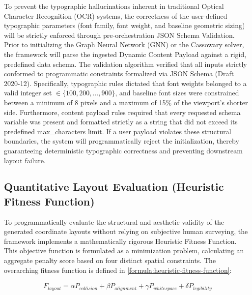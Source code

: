 \begin{refsection}
To prevent the typographic hallucinations inherent in traditional Optical Character Recognition (OCR) systems, the correctness of the user-defined typographic parameters (font family, font weight, and baseline geometric sizing) will be strictly enforced through pre-orchestration JSON Schema Validation. Prior to initializing the Graph Neural Network (GNN) or the Cassowary solver, the framework will parse the ingested Dynamic Content Payload against a rigid, predefined data schema. The validation algorithm verified that all inputs strictly conformed to programmatic constraints formalized via JSON Schema (Draft 2020-12). Specifically, typographic rules dictated that font weights belonged to a valid integer set $\in \{100, 200, \dots, 900\}$, and baseline font sizes were constrained between a minimum of 8 pixels and a maximum of 15\% of the viewport's shorter side. Furthermore, content payload rules required that every requested schema variable was present and formatted strictly as a string that did not exceed its predefined max_characters limit. If a user payload violates these structural boundaries, the system will programmatically reject the initialization, thereby guaranteeing deterministic typographic correctness and preventing downstream layout failure.

\subsection{Quantitative Layout Evaluation (Heuristic Fitness Function)}
To programmatically evaluate the structural and aesthetic validity of the generated coordinate layouts without relying on subjective human surveying, the framework implements a mathematically rigorous Heuristic Fitness Function. This objective function is formulated as a minimization problem, calculating an aggregate penalty score based on four distinct spatial constraints. The overarching fitness function is defined in \ref{formula:heuristic-fitness-function}:

\begin{center}
\begin{minipage}{0.8\textwidth}
\begin{equation}
\begin{aligned}
F_{layout} = \alpha P_{collision} + \beta P_{alignment} + \gamma P_{whitespace} + \delta P_{legibility}
\end{aligned}
\end{equation}
\centering
\label{formula:heuristic-fitness-function}
\end{minipage}
\end{center}


\end{refsection}
